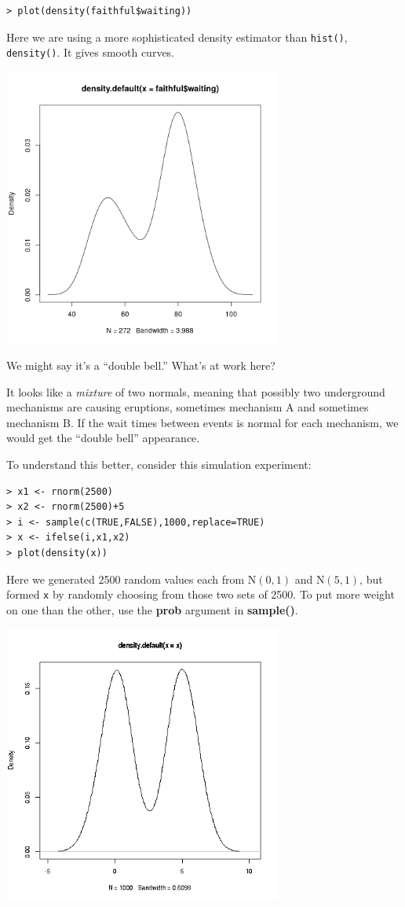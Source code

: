 \begin{lstlisting}
> plot(density(faithful$waiting)) 
\end{lstlisting}

Here we are using a more sophisticated density estimator than
\lstinline{hist()}, \lstinline{density()}.  It gives smooth curves.

\includegraphics[width=3.6in]{Images/DensFaithful.png} 

We might say it's a ``double bell.''  What's at work here?

It looks like a \textit{mixture} of two normals, meaning that possibly
two underground mechanisms are causing eruptions, sometimes mechanism A
and sometimes mechanism B.  If the wait times between events is normal
for each mechanism, we would get the ``double bell'' appearance.

To understand this better, consider this simulation experiment:

\begin{lstlisting}
> x1 <- rnorm(2500) 
> x2 <- rnorm(2500)+5 
> i <- sample(c(TRUE,FALSE),1000,replace=TRUE) 
> x <- ifelse(i,x1,x2) 
> plot(density(x))
\end{lstlisting}

Here we generated 2500 random values each from 
$\textrm{N}(0,1)$ and $\textrm{N}(5,1)$, but formed \lstinline{x}
by randomly choosing from those two sets of 2500.  To put more weight on
one than the other, use the \textbf{prob} argument in \textbf{sample()}.

\includegraphics[width=3.6in]{Images/MixSim.png} 

